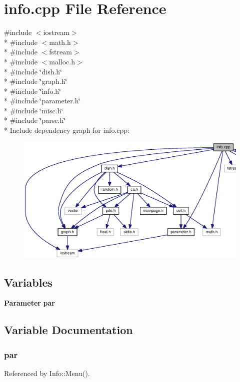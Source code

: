 \section{info.\-cpp File Reference}
\label{info_8cpp}
{\ttfamily \#include $<$iostream$>$}\\*
{\ttfamily \#include $<$math.\-h$>$}\\*
{\ttfamily \#include $<$fstream$>$}\\*
{\ttfamily \#include $<$malloc.\-h$>$}\\*
{\ttfamily \#include \char`\"{}dish.\-h\char`\"{}}\\*
{\ttfamily \#include \char`\"{}graph.\-h\char`\"{}}\\*
{\ttfamily \#include \char`\"{}info.\-h\char`\"{}}\\*
{\ttfamily \#include \char`\"{}parameter.\-h\char`\"{}}\\*
{\ttfamily \#include \char`\"{}misc.\-h\char`\"{}}\\*
{\ttfamily \#include \char`\"{}parse.\-h\char`\"{}}\\*
Include dependency graph for info.\-cpp\-:
\nopagebreak
\begin{figure}[H]
\begin{center}
\leavevmode
\includegraphics[width=350pt]{info_8cpp__incl}
\end{center}
\end{figure}
\subsection*{Variables}
\begin{DoxyCompactItemize}
\item 
{\bf Parameter} {\bf par}
\end{DoxyCompactItemize}


\subsection{Variable Documentation}
\subsubsection[{par}]{ par}\label{info_8cpp_aa11a52593a908c20a7259a3e72c0b348}


Referenced by Info\-::\-Menu().

